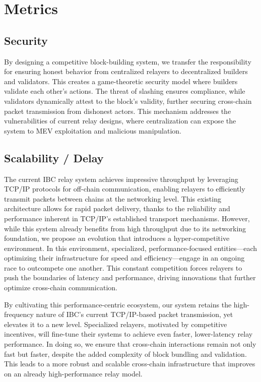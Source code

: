 \documentclass{article}
\begin{document}
\section*{Metrics}

\subsection*{Security}

By designing a competitive block-building system, we transfer the responsibility for ensuring honest behavior from centralized relayers to decentralized builders and validators. This creates a game-theoretic security model where builders validate each other’s actions. The threat of slashing ensures compliance, while validators dynamically attest to the block's validity, further securing cross-chain packet transmission from dishonest actors. This mechanism addresses the vulnerabilities of current relay designs, where centralization can expose the system to MEV exploitation and malicious manipulation.

\subsection*{Scalability / Delay}

The current IBC relay system achieves impressive throughput by leveraging TCP/IP protocols for off-chain communication, enabling relayers to efficiently transmit packets between chains at the networking level. This existing architecture allows for rapid packet delivery, thanks to the reliability and performance inherent in TCP/IP’s established transport mechanisms. However, while this system already benefits from high throughput due to its networking foundation, we propose an evolution that introduces a hyper-competitive environment. In this environment, specialized, performance-focused entities—each optimizing their infrastructure for speed and efficiency—engage in an ongoing race to outcompete one another. This constant competition forces relayers to push the boundaries of latency and performance, driving innovations that further optimize cross-chain communication.

By cultivating this performance-centric ecosystem, our system retains the high-frequency nature of IBC’s current TCP/IP-based packet transmission, yet elevates it to a new level. Specialized relayers, motivated by competitive incentives, will fine-tune their systems to achieve even faster, lower-latency relay performance. In doing so, we ensure that cross-chain interactions remain not only fast but faster, despite the added complexity of block bundling and validation. This leads to a more robust and scalable cross-chain infrastructure that improves on an already high-performance relay model.
\end{document}
